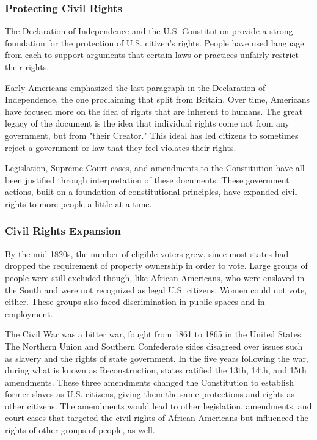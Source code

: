 
\subsubsection{Protecting Civil Rights}

The Declaration of Independence and the U.S. Constitution provide a strong
foundation for the protection of U.S. citizen's rights. People have used
language from each to support arguments that certain laws or practices unfairly
restrict their rights.

Early Americans emphasized the last paragraph in the Declaration of
Independence, the one proclaiming that split from Britain. Over time, Americans
have focused more on the idea of rights that are inherent to humans. The great
legacy of the document is the idea that individual rights come not from any
government, but from "their Creator." This ideal has led citizens to sometimes
reject a government or law that they feel violates their rights.

Legislation, Supreme Court cases, and amendments to the Constitution have all
been justified through interpretation of these documents. These government
actions, built on a foundation of constitutional principles, have expanded civil
rights to more people a little at a time.

\subsubsection{Civil Rights Expansion}

By the mid-1820s, the number of eligible voters grew, since most states had
dropped the requirement of property ownership in order to vote. Large groups of
people were still excluded though, like African Americans, who were enslaved in
the South and were not recognized as legal U.S. citizens. Women could not vote,
either. These groups also faced discrimination in public spaces and in
employment.

The Civil War was a bitter war, fought from 1861 to 1865 in the United States.
The Northern Union and Southern Confederate sides disagreed over issues such as
slavery and the rights of state government. In the five years following the war,
during what is known as Reconstruction, states ratified the 13th, 14th, and 15th
amendments. These three amendments changed the Constitution to establish former
slaves as U.S. citizens, giving them the same protections and rights as other
citizens. The amendments would lead to other legislation, amendments, and court
cases that targeted the civil rights of African Americans but influenced the
rights of other groups of people, as well.

